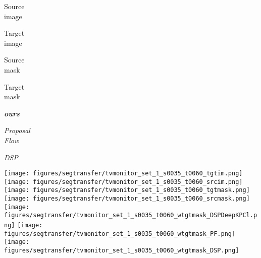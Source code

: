 \documentclass[10pt,twocolumn,letterpaper]{article}
\begin{document}
\begin{figure*}[t]
\begin{minipage}{0.538\linewidth}
\begin{center}
  \begin{minipage}[c]{\segtransferw\linewidth} \centering
  Source \\ image
  \end{minipage}
  \begin{minipage}[c]{\segtransferw\linewidth} \centering
  Target \\ image
  \end{minipage}
  \begin{minipage}[c]{\segtransferw\linewidth} \centering
  Source \\ mask
  \end{minipage}
  \begin{minipage}[c]{\segtransferw\linewidth} \centering
  Target \\ mask
  \end{minipage}
  \begin{minipage}[c]{\segtransferw\linewidth} \centering
  \textit{\textbf{ours}}
  \end{minipage}
  \begin{minipage}[c]{\segtransferw\linewidth} \centering
  \textit{Proposal \\ Flow} \cite{ham2016} %
  \end{minipage}
  \begin{minipage}[c]{\segtransferw\linewidth} \centering
  \textit{DSP} \cite{kim2013deformable} %
  \end{minipage}
  
  \texttt{[image: figures/segtransfer/tvmonitor\_set\_1\_s0035\_t0060\_tgtim.png]}
  \texttt{[image: figures/segtransfer/tvmonitor\_set\_1\_s0035\_t0060\_srcim.png]}
  \texttt{[image: figures/segtransfer/tvmonitor\_set\_1\_s0035\_t0060\_tgtmask.png]}
  \texttt{[image: figures/segtransfer/tvmonitor\_set\_1\_s0035\_t0060\_srcmask.png]}
  \texttt{[image: figures/segtransfer/tvmonitor\_set\_1\_s0035\_t0060\_wtgtmask\_DSPDeepKPCl.png]}
  \texttt{[image: figures/segtransfer/tvmonitor\_set\_1\_s0035\_t0060\_wtgtmask\_PF.png]}
  \texttt{[image: figures/segtransfer/tvmonitor\_set\_1\_s0035\_t0060\_wtgtmask\_DSP.png]}
\\


\end{center}
\end{minipage}
\end{figure*}
\end{document}
